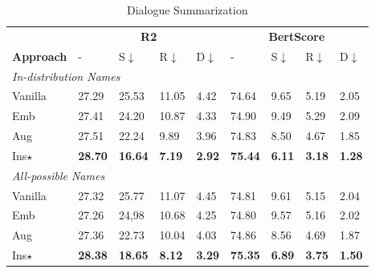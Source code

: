 \begin{table}[h!]
	\scriptsize
	\centering
	\begin{subtable}{\linewidth}
		\scriptsize
		\centering
		\begin{tabular}{p{0.9cm}|p{0.36cm}p{0.36cm}p{0.36cm}p{0.36cm}|p{0.36cm}p{0.36cm}p{0.36cm}p{0.38cm}}
			\toprule[1pt]
			
			& \multicolumn{4}{c|}{\textbf{R2}} & \multicolumn{4}{c}{\textbf{BertScore}} \\
			\textbf{Approach}& - & S$\downarrow$ & R$\downarrow$ & D$\downarrow$ & - & S$\downarrow$  & R$\downarrow$ & D$\downarrow$\\
			
			\hline
			\multicolumn{7}{l}{\textit{In-distribution Names}}\\
			Vanilla &
			27.29 & 25.53 & 11.05& 4.42& 74.64&9.65&5.19 & 2.05\\
			Emb & 27.41 & 24.20  & 10.87 & 4.33&74.90&9.49& 5.29& 2.09  \\
			Aug&
			{27.51} &22.24   & {9.89} & {3.96}&74.83&8.50& 4.67& {1.85}  \\
			Ins$\star$  & \textbf{28.70} &\textbf{16.64}& \textbf{7.19} & \textbf{2.92} & \textbf{75.44} &\textbf{6.11} & \textbf{3.18} & \textbf{1.28}\\

			
			\hline
			\multicolumn{7}{l}{\textit{All-possible Names}}\\
			Vanilla &
			27.32&25.77  & 11.07 & 4.45&74.81 &9.61&5.15& 2.04  \\
			Emb & 27.26 & 24,98  & 10.68 & 4.25&74.80&9.57 & 5.16& 2.02\\
			Aug  &
			27.36 & 22.73 & {10.04} & {4.03} &74.86&8.56& 4.69& 1.87  \\
			Ins$\star$ & \textbf{28.38} &\textbf{18.65} & \textbf{8.12}& \textbf{3.29}  &\textbf{75.35} &\textbf{6.89}& \textbf{3.75} & \textbf{1.50} \\

			\bottomrule[1pt]
		\end{tabular}
		\caption{Dialogue Summarization}
	\end{subtable}
	

\end{table}
